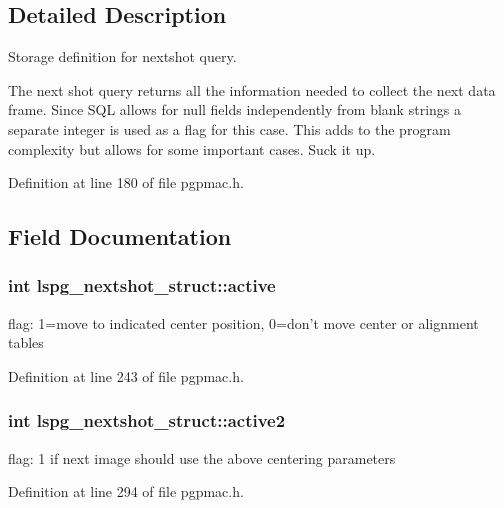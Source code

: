 \subsection{Detailed Description}
Storage definition for nextshot query. 

The next shot query returns all the information needed to collect the next data frame. Since S\-Q\-L allows for null fields independently from blank strings a separate integer is used as a flag for this case. This adds to the program complexity but allows for some important cases. Suck it up. 

Definition at line 180 of file pgpmac.\-h.



\subsection{Field Documentation}
\hypertarget{structlspg__nextshot__struct_a1a94eefbad713976a3d9213695a6ca28}{
\subsubsection[{active}]{\setlength{\rightskip}{0pt plus 5cm}int lspg\-\_\-nextshot\-\_\-struct\-::active}}\label{structlspg__nextshot__struct_a1a94eefbad713976a3d9213695a6ca28}


flag\-: 1=move to indicated center position, 0=don't move center or alignment tables 



Definition at line 243 of file pgpmac.\-h.

\hypertarget{structlspg__nextshot__struct_a2875aa18df587806a3d8c05220fd62b5}{
\subsubsection[{active2}]{\setlength{\rightskip}{0pt plus 5cm}int lspg\-\_\-nextshot\-\_\-struct\-::active2}}\label{structlspg__nextshot__struct_a2875aa18df587806a3d8c05220fd62b5}


flag\-: 1 if next image should use the above centering parameters 



Definition at line 294 of file pgpmac.\-h.

